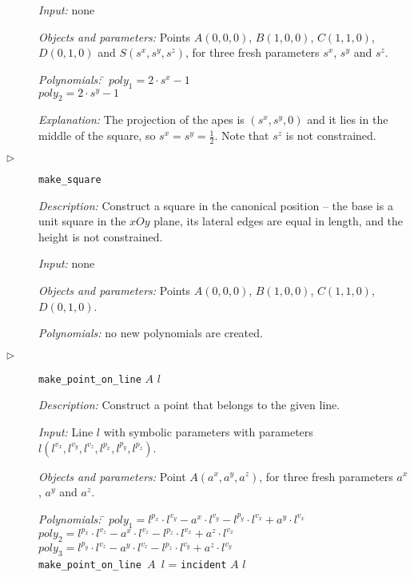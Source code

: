 \documentclass[final,1p,times,authoryear]{elsarticle}
\begin{document}
\begin{description}
  {\em Input:} none

  {\em Objects and parameters:} Points $A(0, 0, 0)$, $B(1, 0, 0)$,
  $C(1, 1, 0)$, $D(0, 1, 0)$ and $S(s^x, s^y, s^z)$, for three fresh
  parameters $s^x$, $s^y$ and $s^z$.
\begin{tabbing}
{\em Polynomials:} \= $poly_1 = 2\cdot s^x - 1$ \\
                   \> $poly_2 = 2\cdot s^y - 1$
\end{tabbing}

{\em Explanation:} The projection of the apes is $(s^x, s^y, 0)$ and
it lies in the middle of the square, so $s^x = s^y =
\frac{1}{2}$. Note that $s^z$ is not constrained.

\item[$\triangleright$] {\tt make\_square}

  {\em Description:} Construct a square in the canonical position --
  the base is a unit square in the $xOy$ plane, its lateral edges are
  equal in length, and the height is not constrained.
  
  {\em Input:} none

  {\em Objects and parameters:} Points $A(0, 0, 0)$, $B(1, 0, 0)$,
  $C(1, 1, 0)$, $D(0, 1, 0)$.

\begin{tabbing}
{\em Polynomials:} no new polynomials are created.
\end{tabbing}

\item[$\triangleright$] {\tt make\_point\_on\_line} $A$ $l$

  {\em Description:} Construct a point that belongs to the given line.
  
  {\em Input:} Line $l$ with symbolic parameters with parameters
  $l(l^{v_x}, l^{v_y}, l^{v_z}, l^{p_x}, l^{p_y}, l^{p_z})$.

  {\em Objects and parameters:} Point $A(a^x, a^y, a^z)$, for three
  fresh parameters $a^x$, $a^y$ and $a^z$.

\begin{tabbing}
{\em Polynomials:} \= $poly_1 = l^{p_x}\cdot l^{v_y} - a^x\cdot l^{v_y} - l^{p_y}\cdot l^{v_x} + a^y\cdot l^{v_x}$ \\
                   \> $poly_2 = l^{p_x}\cdot l^{v_z} - a^x\cdot l^{v_z} - l^{p_z}\cdot l^{v_x} + a^z\cdot l^{v_x}$ \\
                   \> $poly_3 = l^{p_y}\cdot l^{v_z} - a^y\cdot l^{v_z} - l^{p_z}\cdot l^{v_y} + a^z\cdot l^{v_y}$ \\
                   \> {\tt make\_point\_on\_line $A$ $l$} = {\tt incident} $A$ $l$
\end{tabbing}


\end{description}
\end{document}

